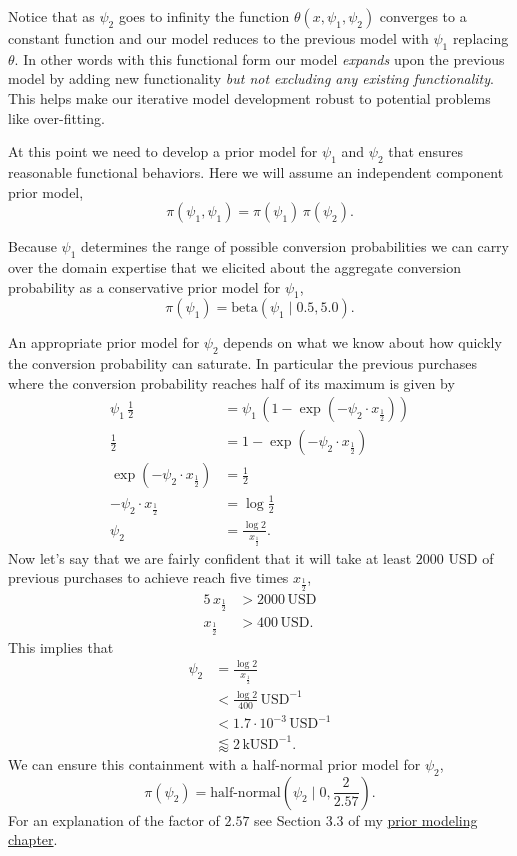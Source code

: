 \documentclass[
  letterpaper,
  DIV=11,
  numbers=noendperiod]{scrartcl}
\begin{document}
Notice that as \(\psi_{2}\) goes to infinity the function
\(\theta(x, \psi_{1}, \psi_{2})\) converges to a constant function and
our model reduces to the previous model with \(\psi_{1}\) replacing
\(\theta\). In other words with this functional form our model
\emph{expands} upon the previous model by adding new functionality
\emph{but not excluding any existing functionality}. This helps make our
iterative model development robust to potential problems like
over-fitting.

At this point we need to develop a prior model for \(\psi_{1}\) and
\(\psi_{2}\) that ensures reasonable functional behaviors. Here we will
assume an independent component prior model, \[
\pi( \psi_{1}, \psi_{1}) = \pi(\psi_{1}) \, \pi(\psi_{2}).
\]

Because \(\psi_{1}\) determines the range of possible conversion
probabilities we can carry over the domain expertise that we elicited
about the aggregate conversion probability as a conservative prior model
for \(\psi_{1}\), \[
\pi( \psi_{1} ) = \mathrm{beta}( \psi_{1} \mid 0.5, 5.0).
\]

An appropriate prior model for \(\psi_{2}\) depends on what we know
about how quickly the conversion probability can saturate. In particular
the previous purchases where the conversion probability reaches half of
its maximum is given by \begin{align*}
\psi_{1} \, \frac{1}{2}
&=
\psi_{1} \,
\left( 1 - \exp \left( - \psi_{2} \cdot x_{\frac{1}{2}} \right) \right)
\\
\frac{1}{2}
&=
1 - \exp \left(- \psi_{2} \cdot x_{\frac{1}{2}} \right)
\\
\exp \left(- \psi_{2} \cdot x_{\frac{1}{2}} \right)
&=
\frac{1}{2}
\\
- \psi_{2} \cdot x_{\frac{1}{2}}
&=
\log \frac{1}{2}
\\
\psi_{2}
&=
\frac{\log 2}{x_{\frac{1}{2}}}.
\end{align*} Now let's say that we are fairly confident that it will
take at least \(2000\) USD of previous purchases to achieve reach five
times \(x_{\frac{1}{2}}\), \begin{align*}
5 \, x_{\frac{1}{2}} &> 2000 \, \mathrm{USD}
\\
x_{\frac{1}{2}} &> 400 \, \mathrm{USD}.
\end{align*} This implies that \begin{align*}
\psi_{2}
&=
\frac{\log 2}{x_{\frac{1}{2}}}
\\
&<
\frac{\log 2}{400} \, \mathrm{USD}^{-1}
\\
&<
1.7 \cdot 10^{-3} \, \mathrm{USD}^{-1}
\\
&\lessapprox 2 \, \mathrm{kUSD}^{-1}.
\end{align*} We can ensure this containment with a half-normal prior
model for \(\psi_{2}\), \[
\pi( \psi_{2} )
=
\text{half-normal} \left( \psi_{2} \mid 0, \frac{2}{2.57} \right).
\] For an explanation of the factor of \(2.57\) see Section 3.3 of my
\href{https://betanalpha.github.io/assets/case_studies/prior_modeling.html}{prior
modeling chapter}.
\end{document}

